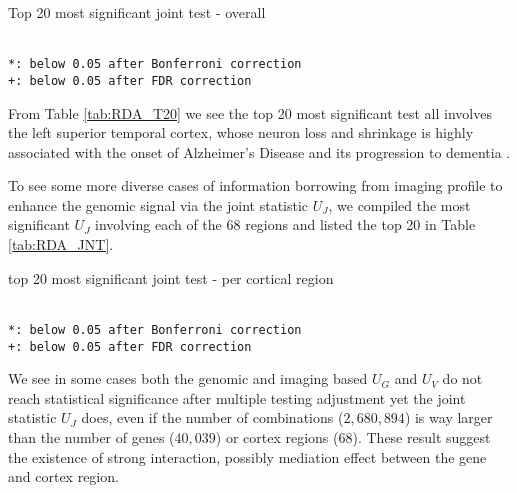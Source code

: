 \begin{table}[!htbp]
\centering
\small
\caption{Top 20 most significant joint test - overall}
\label{tab:RDA_T20}
 \\
\texttt{*: below 0.05 after Bonferroni correction} \\
\texttt{+: below 0.05 after FDR correction}
\end{table}
From Table \ref{tab:RDA_T20} we see the top 20 most significant test all involves the left superior temporal cortex, whose neuron loss and shrinkage is highly associated with the onset of Alzheimer's Disease and its progression to dementia \cite{AD:ST1}. 

To see some more diverse cases of information borrowing from imaging profile to enhance the genomic signal via the joint statistic $U_J$, we compiled the most significant $U_J$ involving each of the 68 regions and listed the top 20 in Table \ref{tab:RDA_JNT}.
\begin{table}[!htbp]
\centering
\small
\caption{top 20 most significant joint test - per cortical region}
\label{tab:RDA_JNT}
 \\
\texttt{*: below 0.05 after Bonferroni correction} \\
\texttt{+: below 0.05 after FDR correction}
\end{table}
We see in some cases both the genomic and imaging based $U_G$ and $U_V$ do not reach statistical significance after multiple testing adjustment yet the joint statistic $U_J$ does, even if the number of combinations ($2,680,894$) is way larger than the number of genes ($40,039$) or cortex regions ($68$). These result suggest the existence of strong interaction, possibly mediation effect between the gene and cortex region.
